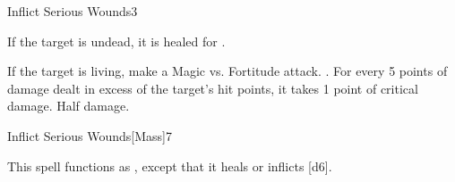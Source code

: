 \begin{spellsection}{Inflict Serious Wounds}{3}
\begin{spellheader}
\end{spellheader}
\begin{spellcontent}
    \begin{spelltargetinginfo}
    \end{spelltargetinginfo}
    \begin{spelleffects}
        \spelleffect If the target is undead, it is healed for .
        \begin{spellattacktriggered}{If the target is living, make a Magic vs. Fortitude attack.}
            \spellsuccess {}. For every 5 points of damage dealt in excess of the target's hit points, it takes 1 point of critical damage.
            \spellfailure Half damage.
        \end{spellattacktriggered}
    \end{spelleffects}
\end{spellcontent}
\begin{spellfooter}
\end{spellfooter}
\end{spellsection}

\begin{spellsection}{Inflict Serious Wounds}[Mass]{7}
\begin{spellheader}
\end{spellheader}
\begin{spellcontent}
    \begin{spelltargetinginfo}
    \end{spelltargetinginfo}
    \begin{spelleffects}
        \spellspecial This spell functions as , except that it heals or inflicts [d6].
    \end{spelleffects}
\end{spellcontent}
\begin{spellfooter}
\end{spellfooter}
\end{spellsection}

